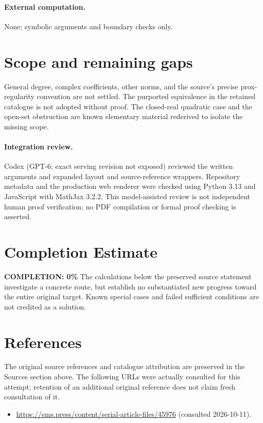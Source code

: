 \documentclass[11pt]{article}
\begin{document}
\paragraph{External computation.} None; symbolic arguments and boundary checks only.
\section{Scope and remaining gaps}
General degree, complex coefficients, other norms, and the source's precise prox-regularity convention are not settled. The purported equivalence in the retained catalogue is not adopted without proof. The closed-real quadratic case and the open-set obstruction are known elementary material rederived to isolate the missing scope.
\paragraph{Integration review.} Codex (GPT-6; exact serving revision not exposed) reviewed the written arguments and expanded layout and source-reference wrappers. Repository metadata and the production web renderer were checked using Python 3.13 and JavaScript with MathJax 3.2.2. This model-assisted review is not independent human proof verification; no PDF compilation or formal proof checking is asserted.

\section{Completion Estimate}
\noindent\textbf{COMPLETION: 0\%}
The calculations below the preserved source statement investigate a concrete route,
but establish no substantiated new progress toward the entire original target.
Known special cases and failed sufficient conditions are not credited as a solution.
\section{References}
The original source references and catalogue attribution are preserved in the
Sources section above. The following URLs were actually consulted for this attempt;
retention of an additional original reference does not claim fresh consultation of it.
\begin{itemize}
\item \url{https://ems.press/content/serial-article-files/45976} (consulted 2026-10-11). 
\end{itemize}
\end{document}
